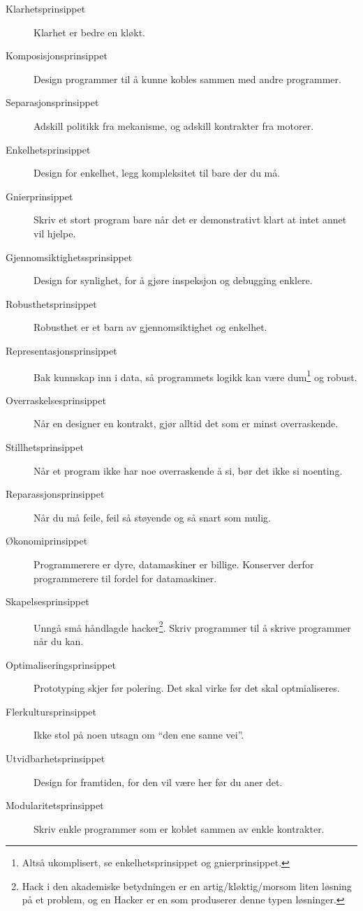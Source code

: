 \documentclass[11pt]{article}
\begin{document}
\begin{description}
\item [Klarhetsprinsippet] Klarhet er bedre en kløkt.
\item [Komposisjonsprinsippet] Design programmer til å kunne kobles sammen med andre programmer.
\item [Separasjonsprinsippet] Adskill politikk fra mekanisme, og adskill kontrakter fra motorer.
\item [Enkelhetsprinsippet] Design for enkelhet, legg kompleksitet til bare der du må.
\item [Gnierprinsippet] Skriv et stort program bare når det er demonstrativt klart at intet annet vil hjelpe.
\item [Gjennomsiktighetssprinsippet] Design for synlighet, for å gjøre inspeksjon og debugging enklere.
\item [Robusthetsprinsippet] Robusthet er et barn av gjennomsiktighet og enkelhet.
\item [Representasjonsprinsippet] Bak kunnskap inn i data, så programmets logikk kan være dum\footnote{Altså ukomplisert, se enkelhetsprinsippet og gnierprinsippet.} og robust.
\item [Overraskelsesprinsippet] Når en designer en kontrakt, gjør alltid det som er minst overraskende.
\item [Stillhetsprinsippet] Når et program ikke har noe overraskende å si, bør det ikke si noenting.
\item [Reparassjonsprinsippet] Når du må feile, feil så støyende og så snart som mulig.
\item [Økonomiprinsippet] Programmerere er dyre, datamaskiner er billige. Konserver derfor programmerere til fordel for datamaskiner.
\item [Skapelsesprinsippet] Unngå små håndlagde hacker\footnote{Hack i den akademiske betydningen er en artig/kløktig/morsom liten løsning på et problem, og en Hacker er en som produserer denne typen løsninger.}. Skriv programmer til å skrive programmer når du kan.
\item [Optimaliseringsprinsippet] Prototyping skjer før polering. Det skal virke før det skal optmialiseres.
\item [Flerkultursprinsippet] Ikke stol på noen utsagn om ``den ene sanne vei''.
\item [Utvidbarhetsprinsippet] Design for framtiden, for den vil være her før du aner det.
\item [Modularitetsprinsippet] Skriv enkle programmer som er koblet sammen av enkle kontrakter.
\end{description}
\end{document}
